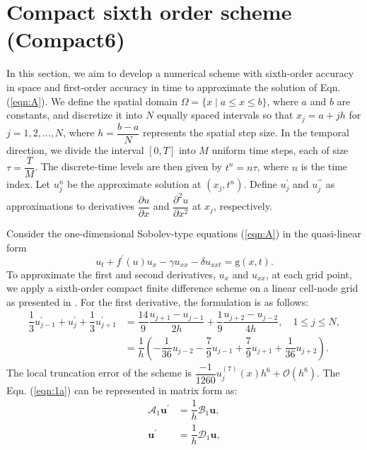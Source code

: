 \documentclass[11pt,a4paper]{amsart}
\theoremstyle{plain}
\theoremstyle{definition}
\theoremstyle{remark}
\numberwithin{equation}{section}
\begin{document}
\section{Compact sixth order scheme (Compact6)}\label{sec:2}
In this section, we aim to develop a numerical scheme with sixth-order accuracy in space and first-order accuracy in time to approximate the solution of Eqn. (\ref{eqn:A}). We define the spatial domain $ \Omega = \{ x \mid a \leq x \leq b \} $, where $ a $ and $ b $ are constants, and discretize it into $ N $ equally spaced intervals so that $ x_j = a + j h $ for $ j = 1, 2, \ldots, N $, where $ h = \dfrac{b-a}{N} $ represents the spatial step size. In the temporal direction, we divide the interval $ [0, T] $ into $ M $ uniform time steps, each of size $ \tau = \dfrac{T}{M} $. The discrete-time levels are then given by $ t^n = n \tau $, where $ n $ is the time index. Let $ u_j^n $ be the approximate solution at $ (x_j, t^n) $. Define $ u^{\prime}_j $ and $ u^{\prime\prime}_j $ as approximations to derivatives $ \dfrac{\partial u}{\partial x} $ and $ \dfrac{\partial^2 u}{\partial x^2} $ at $ x_j $, respectively.
\par
Consider the one-dimensional Sobolev-type equations (\ref{eqn:A}) in the quasi-linear form
\begin{equation}
\label{eqn:Sobolev}
    u_t+f^{\prime}(u) u_x -\gamma u_{xx} - \delta u_{xxt} = \mathrm{g}(x,t).
\end{equation}
To approximate the first and second derivatives, $ u_x $ and $ u_{xx} $, at each grid point, we apply a sixth-order compact finite difference scheme on a linear cell-node grid as presented in \cite{lele1992compact}. For the first derivative, the formulation is as follows:
\begin{equation}
\label{eqn:1a}
\begin{split}
  \dfrac{1}{3} u^{\prime}_{j-1} + u^{\prime}_{j} + \dfrac{1}{3} u^{\prime}_{j+1} &= \dfrac{14}{9} \dfrac{u_{j+1} - u_{j-1}}{2h} + \dfrac{1}{9} \dfrac{u_{j+2} - u_{j-2}}{4h}, \quad 1 \leq j \leq N,\\
  &= \dfrac{1}{h} \left( -\dfrac{1}{36}u_{j-2} -\dfrac{7}{9}u_{j-1}+\dfrac{7}{9}u_{j+1}+\dfrac{1}{36}u_{j+2}\right).
\end{split}
\end{equation}
The local truncation error of the scheme is $\dfrac{-1}{1260} u_j^{(7)}(x) h^6 + \mathcal{O}(h^{8})$.
The Eqn. (\ref{eqn:1a}) can be represented in matrix form as:
\begin{equation}\label{eqn:FD}
\begin{split}
\mathcal{A}_1 \mathbf{u}^{\prime} &= \dfrac{1}{h} \mathcal{B}_1 \mathbf{u}, \\ \mathbf{u}^{\prime} &= \dfrac{1}{h} \mathcal{D}_1 \mathbf{u},
\end{split}
\end{equation}
\end{document}
